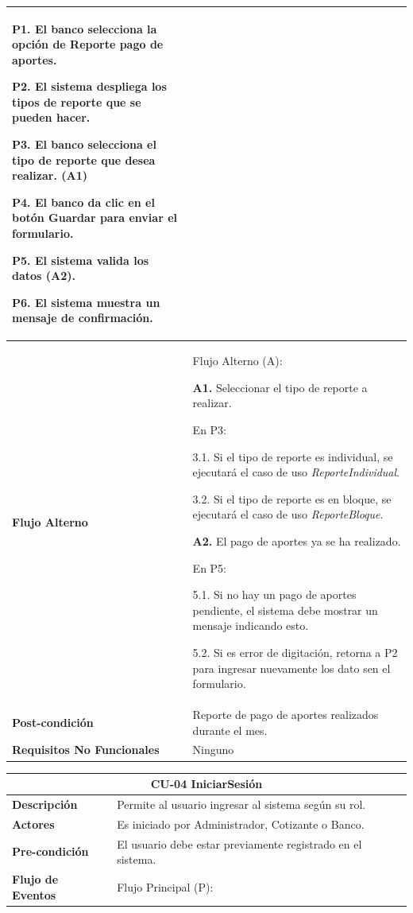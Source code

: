 \documentclass[12pt,a4paper]{article}
\begin{document}
\begin{center}
\begin{tabular}{|m{5.5cm}| m{9.5cm}|}
\textbf{P1.} El banco selecciona la opción de Reporte pago de aportes.

\textbf{P2.} El sistema despliega los tipos de reporte que se pueden hacer.

\textbf{P3.} El banco selecciona el tipo de reporte que desea realizar. (A1)

\textbf{P4.} El banco da clic en el botón Guardar para enviar el formulario.

\textbf{P5.} El sistema valida los datos (A2).

\textbf{P6.} El sistema muestra un mensaje de confirmación.
\\
\hline 
\textbf{Flujo Alterno} &  Flujo Alterno (A):

\textbf{A1.} Seleccionar el tipo de reporte a realizar.

	En P3:
	
	3.1. Si el tipo de reporte es individual, se ejecutará el caso de uso \emph{ReporteIndividual}.
	
	3.2. Si el tipo de reporte es en bloque, se ejecutará el caso de uso \emph{ReporteBloque}.
	
\textbf{A2.} El pago de aportes ya se ha realizado.

	En P5:
	
	5.1. Si no hay un pago de aportes pendiente, el sistema debe mostrar un mensaje indicando esto.
	
	5.2. Si es error de digitación, retorna a P2 para ingresar nuevamente los dato sen el formulario. \\ 
\hline 
\textbf{Post-condición}  & Reporte de pago de aportes realizados durante el mes. \\ 
\hline 
\textbf{Requisitos No Funcionales} & Ninguno \\ 
\hline 
\end{tabular}
\vspace{5mm}

\begin{tabular}{|m{5.5cm}| m{9.5cm}|}
\hline 
\multicolumn{2}{|c|}{\textbf{CU-04 IniciarSesión}} \\ 
\hline 
\textbf{Descripción} & Permite al usuario ingresar al sistema según su rol. \\ 
\hline 
\textbf{Actores} & Es iniciado por Administrador, Cotizante o Banco. \\ 
\hline 
\textbf{Pre-condición} & El usuario debe estar previamente registrado en el sistema. \\ 
\hline 
\textbf{Flujo de Eventos} & Flujo Principal (P):


\end{tabular}
\end{center}
\end{document}
